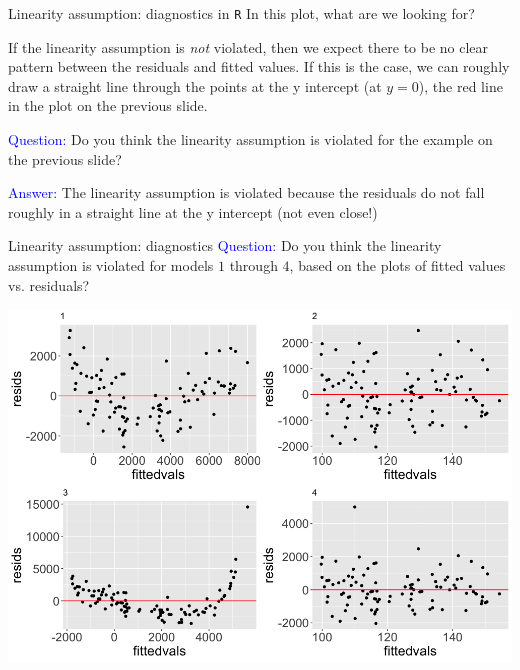 \documentclass[10pt,t]{beamer}
\begin{document}
\begin{frame}{Linearity assumption: diagnostics in \texttt{R}}
In this plot, what are we looking for?

\vspace{0.3cm}

If the linearity assumption is \textit{not} violated, then we expect there to be no clear pattern between the residuals and fitted values. If this is the case, we can roughly draw a straight line through the points at the y intercept (at $y = 0$), the red line in the plot on the previous slide. 

\vspace{0.3cm}

\textcolor{blue}{Question:} Do you think the linearity assumption is violated for the example on the previous slide?\pause

\vspace{0.3cm}

\textcolor{blue}{Answer:} The linearity assumption is violated because the residuals do not fall roughly in a straight line at the y intercept (not even close!)

\end{frame}


\begin{frame}{Linearity assumption: diagnostics}
\textcolor{blue}{Question:} Do you think the linearity assumption is violated for models $1$ through $4$, based on the plots of fitted values vs. residuals?

\centering \includegraphics[scale=0.25]{lin_diagnostics_example.png}

\end{frame}
\end{document}
